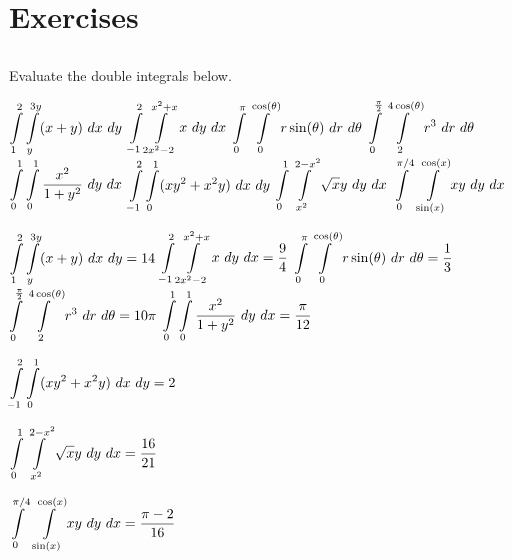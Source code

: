 \newpage
\section{Exercises}
\renewcommand{\ExerciseListName}{Assignement}

\subsection*{}
\begin{Exercise} Evaluate the  double integrals below.
    \begin{multicols}{2}
        \Question[difficulty = 1] $\displaystyle \int\limits_1^2\int\limits_{y}^{3y} (x+y)\ dx\ dy$
        \Question[difficulty = 1] $\displaystyle \int\limits_{-1}^2\int\limits_{2x^2-2}^{x^2+x} x\ dy\ dx$
        \Question[difficulty = 2] $\ds \int\limits_{0}^{\pi}\int\limits_{0}^{\cos(\theta)} r \sin(\theta)\ dr\ d\theta$
        \Question[difficulty = 1] $\ds \int\limits_{0}^{\frac{\pi}{2}}\int\limits_{2}^{4\cos(\theta)} r^3\ dr\ d\theta$
        \Question[difficulty = 2] $\displaystyle \int\limits_{0}^1\int\limits_{0}^{1} \dfrac{x^2}{1+y^2}\ dy\ dx$
        \Question[difficulty = 2] $\displaystyle \int\limits_{-1}^{2} \int\limits_0^1 (xy^2 + x^2y)\ dx\ dy$ 
        \Question[difficulty = 2] $\displaystyle \int\limits_0^1\int\limits_{x^2}^{2-x^2} \sqrt{x}y\ dy\ dx$
        \Question[difficulty = 2] $\ds \int\limits_0^{\pi/4}\ \int\limits_{\sin(x)}^{\cos(x)} xy \ dy\ dx$ 
        \EndCurrentQuestion
    \end{multicols}
\end{Exercise}

\begin{Answer}
    \begin{multicols}{2}
    
        \Question $\displaystyle \int\limits_1^2\int\limits_{y}^{3y} (x+y)\ dx\ dy = 14$
        \Question $\displaystyle \int\limits_{-1}^2\int\limits_{2x^2-2}^{x^2+x} x\ dy\ dx = \dfrac{9}{4}$
        \Question $\ds \int\limits_{0}^{\pi}\int\limits_{0}^{\cos(\theta)} r \sin(\theta)\ dr\ d\theta = \dfrac{1}{3}$
        \Question $\ds \int\limits_{0}^{\frac{\pi}{2}}\int\limits_{2}^{4\cos(\theta)} r^3\ dr\ d\theta = 10 \pi$
        \Question $\displaystyle \int\limits_{0}^1\int\limits_{0}^{1} \dfrac{x^2}{1+y^2}\ dy\ dx = \dfrac{\pi}{12}$
        
        \Question $\displaystyle \int\limits_{-1}^{2} \int\limits_0^1 (xy^2 + x^2y)\ dx\ dy = 2$
        
        \Question $\displaystyle \int\limits_0^1\int\limits_{x^2}^{2-x^2} \sqrt{x}y\ dy\ dx = \dfrac{16}{21} $ 
        
        \Question $\ds \int\limits_0^{\pi/4}\ \int\limits_{\sin(x)}^{\cos(x)} xy \ dy\ dx = \dfrac{\pi - 2}{16}$ 
        
    \EndCurrentQuestion
    \end{multicols}
\end{Answer}

